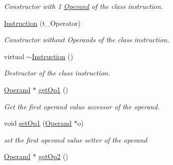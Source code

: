 \begin{DoxyCompactItemize}
\begin{DoxyCompactList}\small\item\em Constructor with 1 \hyperlink{classOperand}{Operand} of the class instruction. \item\end{DoxyCompactList}\item 
\hypertarget{classInstruction_ab2d989cc18e9bf0eeee194a7614514fa}{
\hyperlink{classInstruction_ab2d989cc18e9bf0eeee194a7614514fa}{Instruction} (t\_\-Operator)}
\label{classInstruction_ab2d989cc18e9bf0eeee194a7614514fa}

\begin{DoxyCompactList}\small\item\em Constructor without Operands of the class instruction. \item\end{DoxyCompactList}\item 
\hypertarget{classInstruction_a3f1031e811b710787678f8faf8cc9672}{
virtual \hyperlink{classInstruction_a3f1031e811b710787678f8faf8cc9672}{$\sim$Instruction} ()}
\label{classInstruction_a3f1031e811b710787678f8faf8cc9672}

\begin{DoxyCompactList}\small\item\em Destructor of the class instruction. \item\end{DoxyCompactList}\item 
\hypertarget{classInstruction_a04e2ccada02259b6308917df6cefd06d}{
\hyperlink{classOperand}{Operand} $\ast$ \hyperlink{classInstruction_a04e2ccada02259b6308917df6cefd06d}{getOp1} ()}
\label{classInstruction_a04e2ccada02259b6308917df6cefd06d}

\begin{DoxyCompactList}\small\item\em Get the first operand value accessor of the operand. \item\end{DoxyCompactList}\item 
\hypertarget{classInstruction_ad98f97337a6a2a1bfe344bd79fe54559}{
void \hyperlink{classInstruction_ad98f97337a6a2a1bfe344bd79fe54559}{setOp1} (\hyperlink{classOperand}{Operand} $\ast$o)}
\label{classInstruction_ad98f97337a6a2a1bfe344bd79fe54559}

\begin{DoxyCompactList}\small\item\em set the first operand value setter of the operand \item\end{DoxyCompactList}\item 
\hypertarget{classInstruction_a51c7c00f098ae7b0e824f77d091ea584}{
\hyperlink{classOperand}{Operand} $\ast$ \hyperlink{classInstruction_a51c7c00f098ae7b0e824f77d091ea584}{getOp2} ()}
\label{classInstruction_a51c7c00f098ae7b0e824f77d091ea584}


\end{DoxyCompactItemize}
